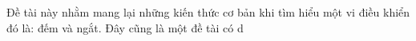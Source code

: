 \documentclass[../report.tex]{subfiles}
\begin{document}
Đề tài này nhằm mang lại những kiến thức cơ bản khi tìm hiểu một vi điều khiển đó là: đếm và ngắt. Đây cũng là một đề tài có d
\end{document}
